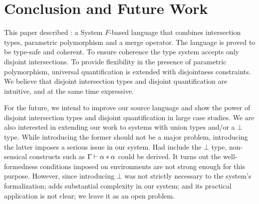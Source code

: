 \section{Conclusion and Future Work}
\label{sec:conclusion}


This paper described \name: a System $F$-based language that combines
intersection types, parametric polymorphism and a merge operator.
The language is proved to be type-safe and coherent.
To ensure coherence the type system accepts only
disjoint intersections. To provide flexibility in the presence of parametric polymorphism,
universal quantification is extended with
disjointness constraints. We believe that disjoint intersection types
and disjoint quantification are intuitive, and at the same time
expressive.


For the future, we intend to improve our source language
and show the power of disjoint intersection types and disjoint
quantification in large case studies.
We are also interested in extending our work to systems with union types and/or 
a $\bot$ type. 
While introducing the former should not be a major problem, introducing the latter imposes a serious 
issue in our system.
Had \name include the $\bot$ type, non-sensical constructs such as $\Gamma \vdash \alpha * \alpha$ could
be derived.
It turns out the well-formedness conditions imposed on environments are not strong enough for 
this purpose.
However, since introducing $\bot$ was not strictly necessary to the system's formalization; adds 
substantial complexity in our system; and its practical application is not clear; we leave it 
as an open problem. 





